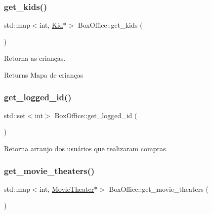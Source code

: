 \mbox{\label{class_box_office_a2269d234e2d52c7a92f4ff39ca40da5d}} 
\subsubsection{\texorpdfstring{get\+\_\+kids()}{get\_kids()}}
{\footnotesize\ttfamily std\+::map$<$int, \hyperlink{class_kid}{Kid}$\ast$$>$ Box\+Office\+::get\+\_\+kids (\begin{DoxyParamCaption}{ }\end{DoxyParamCaption})\hspace{0.3cm}{\ttfamily [inline]}}



Retorna as crianças. 

\begin{DoxyReturn}{Returns}
Mapa de crianças 
\end{DoxyReturn}
\mbox{\label{class_box_office_a5c3ce1833923128d7cd605fc587c7a39}} 
\subsubsection{\texorpdfstring{get\+\_\+logged\+\_\+id()}{get\_logged\_id()}}
{\footnotesize\ttfamily std\+::set$<$int$>$ Box\+Office\+::get\+\_\+logged\+\_\+id (\begin{DoxyParamCaption}{ }\end{DoxyParamCaption})\hspace{0.3cm}{\ttfamily [inline]}}



Retorna arranjo dos usuários que realizaram compras. 

\mbox{\label{class_box_office_ab8369671f04b1ee4a43ee3349dd2e334}} 
\subsubsection{\texorpdfstring{get\+\_\+movie\+\_\+theaters()}{get\_movie\_theaters()}}
{\footnotesize\ttfamily std\+::map$<$int, \hyperlink{class_movie_theater}{Movie\+Theater}$\ast$$>$ Box\+Office\+::get\+\_\+movie\+\_\+theaters (\begin{DoxyParamCaption}{ }\end{DoxyParamCaption})\hspace{0.3cm}{\ttfamily [inline]}}



